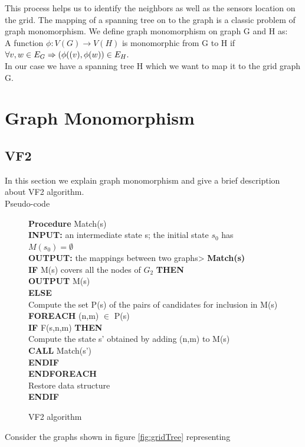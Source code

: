 This process helps us to identify the neighbors as well as the sensors location on the grid. The mapping of a spanning tree on to the graph is a classic problem of graph monomorphism. 
We define graph monomorphism on graph G and H as: \\
A function $ \phi:V(G) \rightarrow  V(H)$ is monomorphic from G to H if   $  \forall v,w \in E_G \Rightarrow (\phi((v),\space \phi(w)) \in E_H.$\\
In our case we have a spanning tree H which we want to map it to the grid graph G.
\section{Graph Monomorphism}
\subsection{VF2}

In this section we explain graph monomorphism and give a brief description about VF2 algorithm.\\
Pseudo-code \\
\begin{figure}
\begin{algorithm}[H]
\textbf{Procedure} Match(s)\\
\textbf{INPUT:}  an intermediate state s; the initial state $s_0$ has $M(s_0)=\emptyset$\\
\textbf{OUTPUT:} the mappings between two graphs>\;
\textbf{Match(s)}\\
 \textbf{IF} M(s) covers all the nodes of $G_2$ \textbf{THEN}\\
               \textbf{OUTPUT} M(s)\\
\textbf{ELSE}\\
                 Compute the set P(s) of the pairs of candidates for inclusion in M(s)\\
\textbf{FOREACH} (n,m) $\in$ P(s)\\
\textbf{IF} F(s,n,m) \textbf{THEN}\\
	Compute the state s' obtained by adding (n,m) to M(s)\\
\textbf{CALL} Match(s')\\
\textbf{ENDIF}\\
\textbf{ENDFOREACH}\\
Restore data structure\\
\textbf{ENDIF}\\
\caption{VF2 algorithm}

\end{algorithm}
\label{fig:VF2}
\end{figure}
Consider the graphs shown in figure \ref{fig:gridTree} representing 

